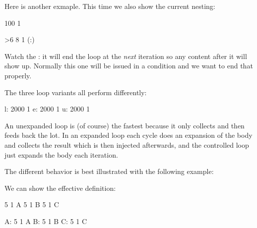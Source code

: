 \startpacked \getbuffer \stoppacked

Here is another exmaple. This time we also show the current nesting:

\startbuffer
{} 100 1 {%
    \ifnum\currentloopiterator>6\relax
        \quitloop
    \else
        [\number\currentloopnesting:\number\currentloopiterator]
         8 1 {%
            (\number\currentloopnesting:\number\currentloopiterator)
        }\par
    \fi
}
\stopbuffer

\typebuffer[option=TEX]

Watch the \type {\quitloop}: it will end the loop at the {\em next} iteration so
any content after it will show up. Normally this one will be issued in a
condition and we want to end that properly.

\startpacked \getbuffer \stoppacked

The three loop variants all perform differently:

\startbuffer
l: { 2000 1 {\relax}} %
  \elapsedtime
e: { 2000 1 {\relax}} %
  \elapsedtime
u: { 2000 1 {\relax}} %
  \elapsedtime
\stopbuffer

\typebuffer[option=TEX]

An unexpanded loop is (of course) the fastest because it only collects and then
feeds back the lot. In an expanded loop each cycle does an expansion of the body
and collects the result which is then injected afterwards, and the controlled
loop just expands the body each iteration.

\startlines\tttf \getbuffer \stoplines

The different behavior is best illustrated with the following example:

\startbuffer[definition]
\edef{} %
\edef\TestB{\expandedloop        1 5 1 {B}}
\edef\TestC{\unexpandedloop      1 5 1 {C\relax}}
\stopbuffer

\typebuffer[definition][option=TEX]

We can show the effective definition:

\startbuffer[example]
\meaningasis\TestA
\meaningasis\TestB
\meaningasis\TestC

A: \TestA
B: \TestB
C: \TestC
\stopbuffer

\typebuffer[example][option=TEX]

